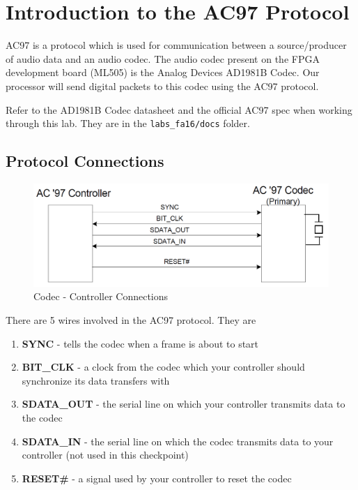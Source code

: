 \documentclass[11pt]{article}
\begin{document}
\section{Introduction to the AC97 Protocol}
AC97 is a protocol which is used for communication between a source/producer of audio data and an audio codec. The audio codec present on the FPGA development board (ML505) is the Analog Devices AD1981B Codec. Our processor will send digital packets to this codec using the AC97 protocol.

Refer to the AD1981B Codec datasheet and the official AC97 spec when working through this lab. They are in the \verb|labs_fa16/docs| folder.

\subsection{Protocol Connections}

\begin{figure}[hbt]
	\begin{center}
		\includegraphics[width=6in]{ac97_connections}
		\caption{Codec - Controller Connections}
	\end{center}
\end{figure}

There are 5 wires involved in the AC97 protocol. They are

\begin{enumerate}
	\item \textbf{SYNC} - tells the codec when a frame is about to start
	\item \textbf{BIT\_CLK} - a clock from the codec which your controller should synchronize its data transfers with
	\item \textbf{SDATA\_OUT} - the serial line on which your controller transmits data to the codec
	\item \textbf{SDATA\_IN} - the serial line on which the codec transmits data to your controller (not used in this checkpoint)
	\item \textbf{RESET\#} - a signal used by your controller to reset the codec
\end{enumerate}
\end{document}
